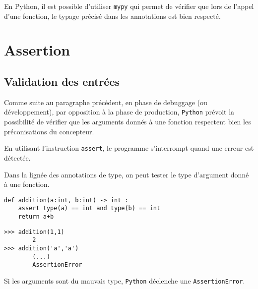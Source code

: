\begin{remarque}
En Python, il est possible d'utiliser \texttt{mypy} qui permet de vérifier que lors de l'appel d'une fonction, le typage précisé dans les annotations est bien respecté. 
\end{remarque}



\section{Assertion}
\subsection{Validation des entrées}
Comme suite au paragraphe précédent, en phase de debuggage (ou développement), par opposition à la phase de production, \texttt{Python} prévoit la possibilité de vérifier que les arguments donnés à une fonction respectent bien les préconisations du concepteur. 

En utilisant l’instruction \texttt{assert}, le programme s'interrompt quand une erreur est détectée. 

\begin{exemple}
Dans la lignée des annotations de type, on peut tester le type d'argument donné à une fonction. 

\begin{minipage}[c]{.45\linewidth}
\begin{lstlisting}
def addition(a:int, b:int) -> int : 
    assert type(a) == int and type(b) == int
    return a+b
\end{lstlisting}
\end{minipage} \hfill
\begin{minipage}[c]{.45\linewidth}
\begin{lstlisting}
>>> addition(1,1)
        2
>>> addition('a','a')
        (...)
        AssertionError
\end{lstlisting}
\end{minipage} 

Si les arguments sont du mauvais type, \texttt{Python} déclenche une \texttt{AssertionError}.
\end{exemple}


